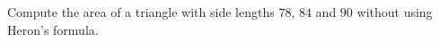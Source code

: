 Compute the area of a triangle with side lengths $78$, $84$ and $90$ without using Heron's formula.
